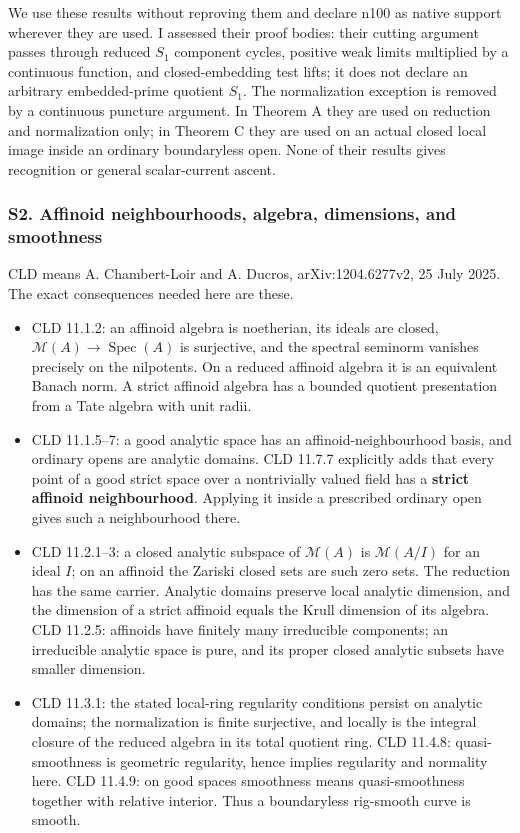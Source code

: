 \documentclass[
  11pt,
]{article}
\providecommand{\tightlist}{%
  \setlength{\itemsep}{0pt}\setlength{\parskip}{0pt}}
\begin{document}
We use these results without reproving them and declare n100 as native
support wherever they are used. I assessed their proof bodies: their
cutting argument passes through reduced \(S_1\) component cycles,
positive weak limits multiplied by a continuous function, and
closed-embedding test lifts; it does not declare an arbitrary
embedded-prime quotient \(S_1\). The normalization exception is removed
by a continuous puncture argument. In Theorem A they are used on
reduction and normalization only; in Theorem C they are used on an
actual closed local image inside an ordinary boundaryless open. None of
their results gives recognition or general scalar-current ascent.

\subsubsection{S2. Affinoid neighbourhoods, algebra, dimensions, and
smoothness}\label{s2.-affinoid-neighbourhoods-algebra-dimensions-and-smoothness}

CLD means A. Chambert-Loir and A. Ducros, arXiv:1204.6277v2, 25 July
2025. The exact consequences needed here are these.

\begin{itemize}
\tightlist
\item
  CLD 11.1.2: an affinoid algebra is noetherian, its ideals are closed,
  \(\mathcal M(A)\to\operatorname{Spec}(A)\) is surjective, and the
  spectral seminorm vanishes precisely on the nilpotents. On a reduced
  affinoid algebra it is an equivalent Banach norm. A strict affinoid
  algebra has a bounded quotient presentation from a Tate algebra with
  unit radii.
\item
  CLD 11.1.5--7: a good analytic space has an affinoid-neighbourhood
  basis, and ordinary opens are analytic domains. CLD 11.7.7 explicitly
  adds that every point of a good strict space over a nontrivially
  valued field has a \textbf{strict affinoid neighbourhood}. Applying it
  inside a prescribed ordinary open gives such a neighbourhood there.
\item
  CLD 11.2.1--3: a closed analytic subspace of \(\mathcal M(A)\) is
  \(\mathcal M(A/I)\) for an ideal \(I\); on an affinoid the Zariski
  closed sets are such zero sets. The reduction has the same carrier.
  Analytic domains preserve local analytic dimension, and the dimension
  of a strict affinoid equals the Krull dimension of its algebra. CLD
  11.2.5: affinoids have finitely many irreducible components; an
  irreducible analytic space is pure, and its proper closed analytic
  subsets have smaller dimension.
\item
  CLD 11.3.1: the stated local-ring regularity conditions persist on
  analytic domains; the normalization is finite surjective, and locally
  is the integral closure of the reduced algebra in its total quotient
  ring. CLD 11.4.8: quasi-smoothness is geometric regularity, hence
  implies regularity and normality here. CLD 11.4.9: on good spaces
  smoothness means quasi-smoothness together with relative interior.
  Thus a boundaryless rig-smooth curve is smooth.
\end{itemize}
\end{document}
